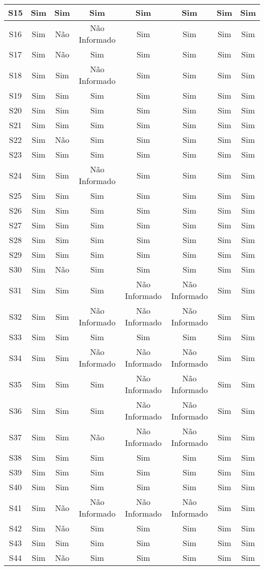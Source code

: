 \begin{landscape}
\begin{longtable}{c|c|c|c|c|c|c|c}
		S15 & Sim & Sim & Sim & Sim & Sim & Sim & Sim \\\hline
		S16 & Sim & Não & Não Informado & Sim & Sim & Sim & Sim \\\hline
		S17 & Sim & Não & Sim & Sim & Sim & Sim & Sim \\\hline
		S18 & Sim & Sim & Não Informado & Sim & Sim & Sim & Sim \\\hline
		S19 & Sim & Sim & Sim & Sim & Sim & Sim & Sim \\\hline
		S20 & Sim & Sim & Sim & Sim & Sim & Sim & Sim \\\hline
		S21 & Sim & Sim & Sim & Sim & Sim & Sim & Sim \\\hline
		S22 & Sim & Não & Sim & Sim & Sim & Sim & Sim \\\hline
		S23 & Sim & Sim & Sim & Sim & Sim & Sim & Sim \\\hline
		S24 & Sim & Sim & Não Informado & Sim & Sim & Sim & Sim \\\hline
		S25 & Sim & Sim & Sim & Sim & Sim & Sim & Sim \\\hline
		S26 & Sim & Sim & Sim & Sim & Sim & Sim & Sim \\\hline
		S27 & Sim & Sim & Sim & Sim & Sim & Sim & Sim \\\hline
		S28 & Sim & Sim & Sim & Sim & Sim & Sim & Sim \\\hline
		S29 & Sim & Sim & Sim & Sim & Sim & Sim & Sim \\\hline
		S30 & Sim & Não & Sim & Sim & Sim & Sim & Sim \\\hline
		S31 & Sim & Sim & Sim & Não Informado & Não Informado & Sim & Sim \\\hline
		S32 & Sim & Sim & Não Informado & Não Informado & Não Informado & Sim & Sim \\\hline
		S33 & Sim & Sim & Sim & Sim & Sim & Sim & Sim \\\hline
		S34 & Sim & Sim & Não Informado & Não Informado & Não Informado & Sim & Sim \\\hline
		S35 & Sim & Sim & Sim & Não Informado & Não Informado & Sim & Sim \\\hline
		S36 & Sim & Sim & Sim & Não Informado & Não Informado & Sim & Sim \\\hline
		S37 & Sim & Sim & Não & Não Informado & Não Informado & Sim & Sim \\\hline
		S38 & Sim & Sim & Sim & Sim & Sim & Sim & Sim \\\hline
		S39 & Sim & Sim & Sim & Sim & Sim & Sim & Sim \\\hline
		S40 & Sim & Sim & Sim & Sim & Sim & Sim & Sim \\\hline
		S41 & Sim & Não & Não Informado & Não Informado & Não Informado & Sim & Sim \\\hline
		S42 & Sim & Não & Sim & Sim & Sim & Sim & Sim \\\hline
		S43 & Sim & Sim & Sim & Sim & Sim & Sim & Sim \\\hline
		S44 & Sim & Não & Sim & Sim & Sim & Sim & Sim \\\hline		
	\end{longtable}
\end{landscape}

